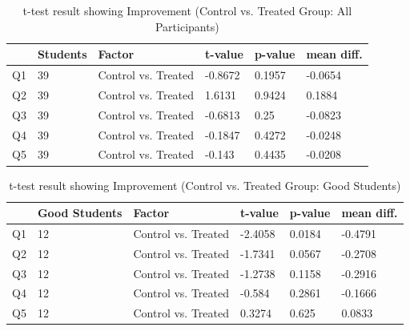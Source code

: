 \begin{table}[ht]
	\centering	
	\begin{tabular}{|p{1cm}|p{2cm}|p{3.5cm}|p{1.5cm}|p{1.5cm}|p{1.5cm}|}
		\hline
		\rowcolor[gray]{.8}	
		\textbf{} & \textbf{Students} & \textbf{Factor} & \textbf{t-value} & \textbf{p-value} & \textbf{mean diff.}\\
		\hline
		Q1 & 39 & Control vs. Treated & -0.8672 & 0.1957 & -0.0654\\
		\hline
		Q2 & 39 & Control vs. Treated & 1.6131 & 0.9424 & 0.1884\\
		\hline
		Q3 & 39 & Control vs. Treated & -0.6813 & 0.25 & -0.0823\\
		\hline	
		Q4 & 39 & Control vs. Treated & -0.1847 & 0.4272 & -0.0248\\
		\hline
		Q5 & 39 & Control vs. Treated & -0.143 & 0.4435 & -0.0208\\
		\hline			
	\end{tabular}
	\caption{t-test result showing Improvement (Control vs. Treated Group: All Participants)}
	\label{tab:t-test_controltreated}
\end{table}

\begin{table}[ht]
	\centering	
	\begin{tabular}{|p{1cm}|p{2cm}|p{3.5cm}|p{1.5cm}|p{1.5cm}|p{1.5cm}|}
		\hline
		\rowcolor[gray]{.8}	
		\textbf{} & \textbf{Good Students} & \textbf{Factor} & \textbf{t-value} & \textbf{p-value} & \textbf{mean diff.}\\
		\hline
		Q1 & 12 & Control vs. Treated & -2.4058 & 0.0184 & -0.4791\\
		\hline
		Q2 & 12 & Control vs. Treated & -1.7341 & 0.0567 & -0.2708\\
		\hline
		Q3 & 12 & Control vs. Treated & -1.2738 & 0.1158 & -0.2916\\
		\hline	
		Q4 & 12 & Control vs. Treated & -0.584 & 0.2861 & -0.1666\\
		\hline
		Q5 & 12 & Control vs. Treated & 0.3274 & 0.625 & 0.0833\\
		\hline			
	\end{tabular}
	\caption{t-test result showing Improvement (Control vs. Treated Group: Good Students)}
	\label{tab:t-test_controltreated_good}
\end{table}

